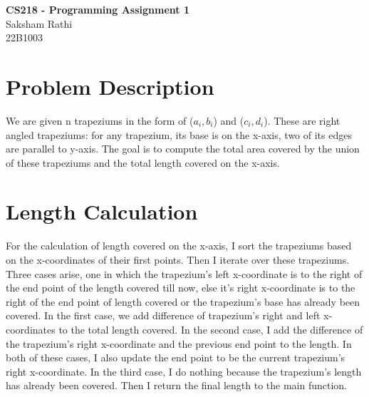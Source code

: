 \documentclass[a4paper,12pt]{article}
\begin{document}
\vspace{5cm}
\begin{center}
    \textbf{\Huge CS218 - Programming Assignment 1}\\
    \vspace{1cm}
    Saksham Rathi\\
    22B1003
\end{center}
\vspace{2cm}

\section{Problem Description}
We are given n trapeziums in the form of ($a_i, b_i$) and ($c_i, d_i$). These
are right angled trapeziums: for any trapezium, its base is on the x-axis, two of its edges are parallel to y-axis.
The goal is to compute the total area covered by the union of these
trapeziums and the total length covered on the x-axis.


\section{Length Calculation}
For the calculation of length covered on the x-axis, I sort the trapeziums based on the x-coordinates of their 
first points. Then I iterate over these trapeziums. Three cases arise, one in which the trapezium's left x-coordinate
is to the right of the end point of the length covered till now, else it's right x-coordinate is to the right of the end point of length covered
or the trapezium's base has already been covered. In the first case, we add difference of trapezium's right and left x-coordinates to the total length covered. In the second case,
I add the difference of the trapezium's right x-coordinate and the previous end point to the length. In both 
of these cases, I also update the end point to be the current trapezium's right x-coordinate. In the third
case, I do nothing because the trapezium's length has already been covered. Then I return the final length to the main function.
\end{document}
